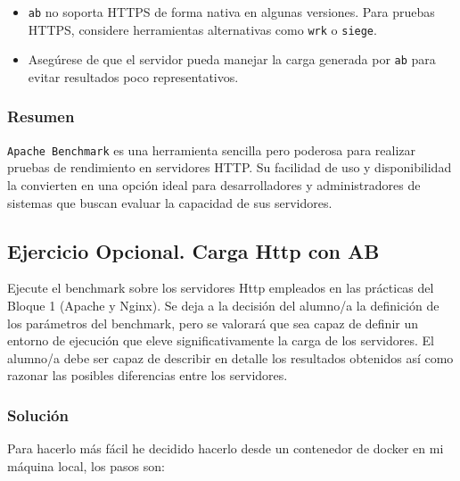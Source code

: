 \begin{itemize}
    \item \texttt{ab} no soporta HTTPS de forma nativa en algunas versiones. Para pruebas HTTPS, considere herramientas alternativas como \texttt{wrk} o \texttt{siege}.
    \item Asegúrese de que el servidor pueda manejar la carga generada por \texttt{ab} para evitar resultados poco representativos.
\end{itemize}

\subsubsection{Resumen}

\texttt{Apache Benchmark} es una herramienta sencilla pero poderosa para realizar pruebas de rendimiento en servidores HTTP. Su facilidad de uso y disponibilidad la convierten en una opción ideal para desarrolladores y administradores de sistemas que buscan evaluar la capacidad de sus servidores.

\subsection{Ejercicio Opcional. Carga Http con AB}

Ejecute el benchmark sobre los servidores Http empleados en las prácticas del Bloque 1 (Apache y Nginx). Se deja a la decisión del alumno/a la definición de los parámetros del benchmark, pero se valorará que sea capaz de definir un entorno de ejecución que eleve significativamente la carga de los servidores. El alumno/a debe ser capaz de describir en detalle los resultados obtenidos así como razonar las posibles diferencias entre los servidores.


\subsubsection{Solución}

Para hacerlo más fácil he decidido hacerlo desde un contenedor de docker en mi máquina local, los pasos son:

